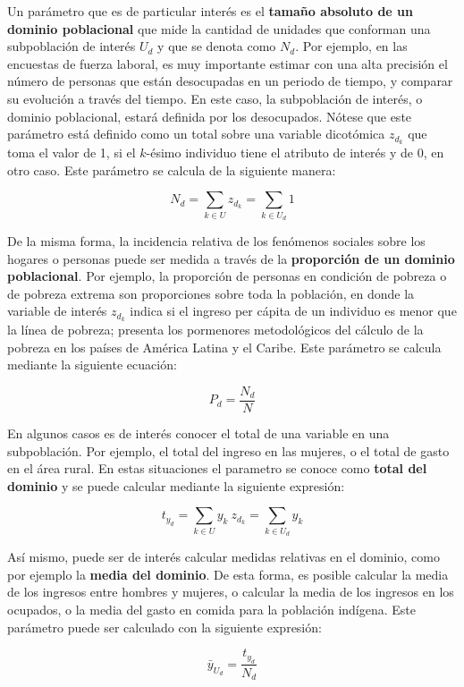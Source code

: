 \documentclass[
  12pt,
]{book}
\begin{document}
Un parámetro que es de particular interés es el \textbf{tamaño absoluto de un dominio poblacional} que mide la cantidad de unidades que conforman una subpoblación de interés \(U_d\) y que se denota como \(N_d\). Por ejemplo, en las encuestas de fuerza laboral, es muy importante estimar con una alta precisión el número de personas que están desocupadas en un periodo de tiempo, y comparar su evolución a través del tiempo. En este caso, la subpoblación de interés, o dominio poblacional, estará definida por los desocupados. Nótese que este parámetro está definido como un total sobre una variable dicotómica \(z_{d_k}\) que toma el valor de 1, si el \(k\)-ésimo individuo tiene el atributo de interés y de 0, en otro caso. Este parámetro se calcula de la siguiente manera:

\[N_d = \sum_{k \in U}z_{d_k} = \sum_{k \in U_d}1\]

De la misma forma, la incidencia relativa de los fenómenos sociales sobre los hogares o personas puede ser medida a través de la \textbf{proporción de un dominio poblacional}. Por ejemplo, la proporción de personas en condición de pobreza o de pobreza extrema son proporciones sobre toda la población, en donde la variable de interés \(z_{d_k}\) indica si el ingreso per cápita de un individuo es menor que la línea de pobreza; \citet{CEPAL_2018} presenta los pormenores metodológicos del cálculo de la pobreza en los países de América Latina y el Caribe. Este parámetro se calcula mediante la siguiente ecuación:

\[P_d=\frac{N_d}{N}\]

En algunos casos es de interés conocer el total de una variable en una subpoblación. Por ejemplo, el total del ingreso en las mujeres, o el total de gasto en el área rural. En estas situaciones el parametro se conoce como \textbf{total del dominio} y se puede calcular mediante la siguiente expresión:

\[t_{y_d} = \sum_{k \in U}y_{k} \ z_{d_k} = \sum_{k \in U_d}y_{k}\]

Así mismo, puede ser de interés calcular medidas relativas en el dominio, como por ejemplo la \textbf{media del dominio}. De esta forma, es posible calcular la media de los ingresos entre hombres y mujeres, o calcular la media de los ingresos en los ocupados, o la media del gasto en comida para la población indígena. Este parámetro puede ser calculado con la siguiente expresión:

\[\bar y_{U_d} = \frac{t_{y_d}}{N_d}\]
\end{document}
